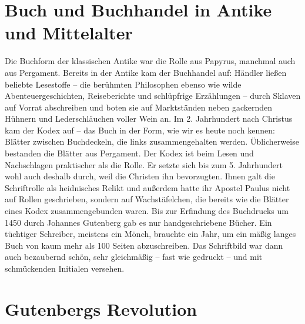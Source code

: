 \documentclass[a4paper,
fontsize=11pt,
oneside,
numbers=noperiodatend,
parskip=half-,
bibliography=totoc,
final
]{scrartcl}
\begin{document}
\hypertarget{buch-und-buchhandel-in-antike-und-mittelalter}{%
\section{Buch und Buchhandel in Antike und
Mittelalter}\label{buch-und-buchhandel-in-antike-und-mittelalter}}

Die Buchform der klassischen Antike war die Rolle aus Papyrus, manchmal
auch aus Pergament. Bereits in der Antike kam der Buchhandel auf:
Händler ließen beliebte Lesestoffe -- die berühmten Philosophen ebenso
wie wilde Abenteuergeschichten, Reiseberichte und schlüpfrige
Erzählungen -- durch Sklaven auf Vorrat abschreiben und boten sie auf
Marktständen neben gackernden Hühnern und Lederschläuchen voller Wein
an. Im 2. Jahrhundert nach Christus kam der Kodex auf -- das Buch in der
Form, wie wir es heute noch kennen: Blätter zwischen Buchdeckeln, die
links zusammengehalten werden. Üblicherweise bestanden die Blätter aus
Pergament. Der Kodex ist beim Lesen und Nachschlagen praktischer als die
Rolle. Er setzte sich bis zum 5. Jahrhundert wohl auch deshalb durch,
weil die Christen ihn bevorzugten. Ihnen galt die Schriftrolle als
heidnisches Relikt und außerdem hatte ihr Apostel Paulus nicht auf
Rollen geschrieben, sondern auf Wachstäfelchen, die bereits wie die
Blätter eines Kodex zusammengebunden waren. Bis zur Erfindung des
Buchdrucks um 1450 durch Johannes Gutenberg gab es nur handgeschriebene
Bücher. Ein tüchtiger Schreiber, meistens ein Mönch, brauchte ein Jahr,
um ein mäßig langes Buch von kaum mehr als 100 Seiten abzuschreiben. Das
Schriftbild war dann auch bezaubernd schön, sehr gleichmäßig -- fast wie
gedruckt -- und mit schmückenden Initialen versehen.

\hypertarget{gutenbergs-revolution}{%
\section{Gutenbergs Revolution}\label{gutenbergs-revolution}}
\end{document}
